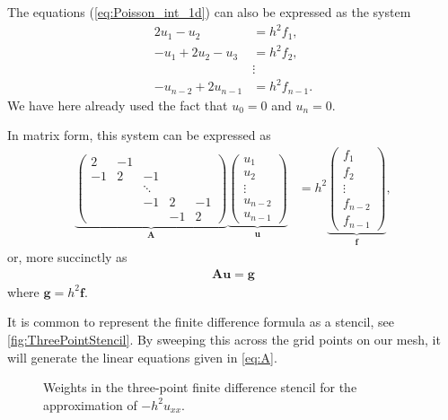 The equations (\ref{eq:Poisson_int_1d}) can also be expressed as the system
\begin{align*}
  2 u_1 - u_2 &= h^2 f_1, \\
  -u_1 + 2 u_2 - u_3 &= h^2 f_2, \\
  &\vdots \\
  -u_{n-2} + 2 u_{n-1} &= h^2 f_{n-1}.
\end{align*}
We have here already used the fact that $u_0=0$ and $u_{n}=0$.

In matrix form, this system can be expressed as
\begin{align}
 \underbrace{ \begin{pmatrix}
    2 & -1 & & & \\
    -1 & 2 & -1 & & \\
    & & \ddots & & \\
    & & -1 & 2 & -1 \\
    & & & -1 & 2
  \end{pmatrix}
  }_{\bm A}
  \underbrace{ \begin{pmatrix}
    u_1 \\
    u_2 \\
    \vdots \\
    u_{n-2} \\
    u_{n-1}
  \end{pmatrix}
  }_{\bm u}
  &= h^2
  \underbrace{ \begin{pmatrix}
    f_1 \\
    f_2 \\
    \vdots \\
    f_{n-2} \\
    f_{n-1}
  \end{pmatrix}
  }_{\bm f} ,
  \label{eq:A}
\end{align}
or, more succinctly as
\begin{align*}
  \bm A \bm u = \bm g
\end{align*}
where $\bm g = h^2 \bm f$.

It is common to represent the finite difference formula as a stencil, see
\autoref{fig:ThreePointStencil}. By sweeping this across the grid points on our
mesh, it will generate the linear equations given in \eqref{eq:A}.
\begin{figure}
  \centering
  
  \caption{
    Weights in the three-point finite difference stencil for the approximation
    of $-h^2u_{xx}$.
  }
  \label{fig:ThreePointStencil}
\end{figure}

